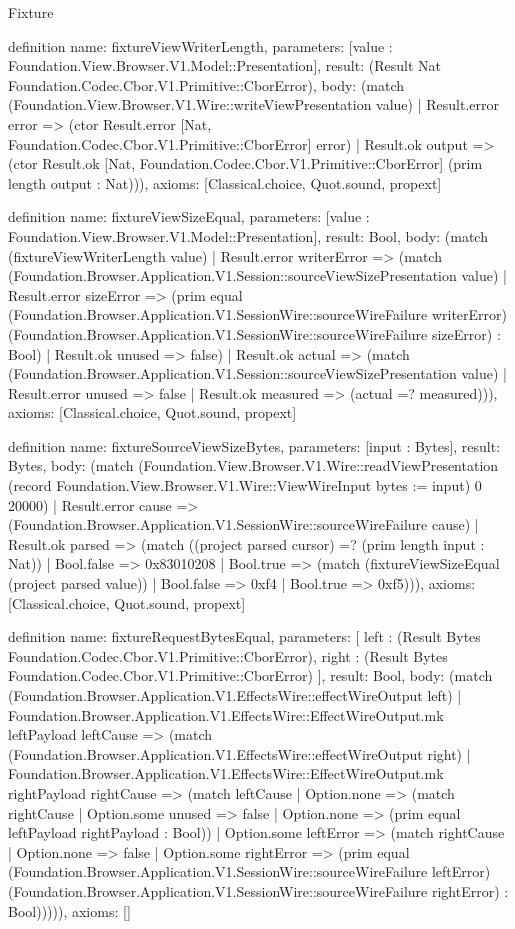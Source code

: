 \begin{lexlean}{Fixture}
\begin{semanticmodule}
definition{
  name: fixtureViewWriterLength,
  parameters: [value : Foundation.View.Browser.V1.Model::Presentation],
  result: (Result Nat Foundation.Codec.Cbor.V1.Primitive::CborError),
  body: (match (Foundation.View.Browser.V1.Wire::writeViewPresentation value)
    | Result.error error => (ctor Result.error [Nat, Foundation.Codec.Cbor.V1.Primitive::CborError] error)
    | Result.ok output => (ctor Result.ok [Nat, Foundation.Codec.Cbor.V1.Primitive::CborError] (prim length output : Nat))),
  axioms: [Classical.choice, Quot.sound, propext]
}

definition{
  name: fixtureViewSizeEqual,
  parameters: [value : Foundation.View.Browser.V1.Model::Presentation],
  result: Bool,
  body: (match (fixtureViewWriterLength value)
    | Result.error writerError => (match (Foundation.Browser.Application.V1.Session::sourceViewSizePresentation value)
      | Result.error sizeError => (prim equal (Foundation.Browser.Application.V1.SessionWire::sourceWireFailure writerError) (Foundation.Browser.Application.V1.SessionWire::sourceWireFailure sizeError) : Bool)
      | Result.ok unused => false)
    | Result.ok actual => (match (Foundation.Browser.Application.V1.Session::sourceViewSizePresentation value)
      | Result.error unused => false
      | Result.ok measured => (actual =? measured))),
  axioms: [Classical.choice, Quot.sound, propext]
}

definition{
  name: fixtureSourceViewSizeBytes,
  parameters: [input : Bytes],
  result: Bytes,
  body: (match (Foundation.View.Browser.V1.Wire::readViewPresentation (record Foundation.View.Browser.V1.Wire::ViewWireInput {bytes := input}) 0 20000)
    | Result.error cause => (Foundation.Browser.Application.V1.SessionWire::sourceWireFailure cause)
    | Result.ok parsed => (match ((project parsed cursor) =? (prim length input : Nat))
      | Bool.false => 0x83010208
      | Bool.true => (match (fixtureViewSizeEqual (project parsed value))
        | Bool.false => 0xf4
        | Bool.true => 0xf5))),
  axioms: [Classical.choice, Quot.sound, propext]
}

definition{
  name: fixtureRequestBytesEqual,
  parameters: [
    left : (Result Bytes Foundation.Codec.Cbor.V1.Primitive::CborError),
    right : (Result Bytes Foundation.Codec.Cbor.V1.Primitive::CborError)
  ],
  result: Bool,
  body: (match (Foundation.Browser.Application.V1.EffectsWire::effectWireOutput left)
    | Foundation.Browser.Application.V1.EffectsWire::EffectWireOutput.mk leftPayload leftCause => (match (Foundation.Browser.Application.V1.EffectsWire::effectWireOutput right)
      | Foundation.Browser.Application.V1.EffectsWire::EffectWireOutput.mk rightPayload rightCause => (match leftCause
        | Option.none => (match rightCause
          | Option.some unused => false
          | Option.none => (prim equal leftPayload rightPayload : Bool))
        | Option.some leftError => (match rightCause
          | Option.none => false
          | Option.some rightError => (prim equal (Foundation.Browser.Application.V1.SessionWire::sourceWireFailure leftError) (Foundation.Browser.Application.V1.SessionWire::sourceWireFailure rightError) : Bool))))),
  axioms: []
}


\end{semanticmodule}
\end{lexlean}
